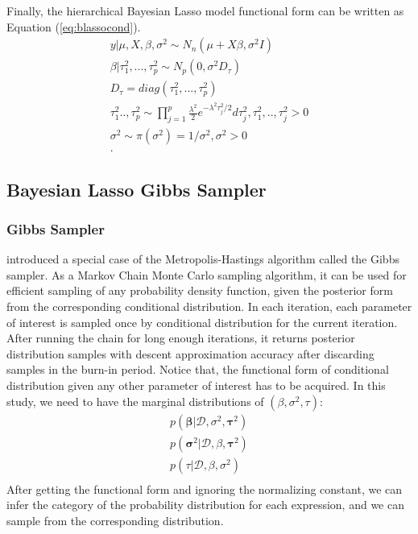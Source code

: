 Finally, the hierarchical Bayesian Lasso model functional form can be written as Equation (\ref{eq:blassocond}).
\begin{equation}
	\label{eq:blassocond}
	\begin{multlined}
		y|\mu,X,\beta,\sigma^2 \sim N_n(\mu + X\beta,\sigma^2I)\\
		\beta|\tau_1^2,...,\tau_p^2 \sim N_p(0,\sigma^2D_{\tau})\\
		D_{\tau} = diag(\tau_1^2,...,\tau_p^2)\\
		\tau_1^2..,\tau_p^2 \sim \prod_{j=1}^p \frac{\lambda^2}{2} e^{-\lambda^2\tau_j^2/2}d\tau_j^2, \tau_1^2,..,\tau_j^2 > 0\\
		\sigma^2 \sim \pi(\sigma^2) = 1/\sigma^2, \sigma^2 > 0\\.
	\end{multlined}
\end{equation}

\subsection{Bayesian Lasso Gibbs Sampler}
\subsubsection{Gibbs Sampler}
\cite{4767596} introduced a special case of the Metropolis-Hastings algorithm called the Gibbs sampler. As a Markov Chain Monte Carlo sampling algorithm, it can be used for efficient sampling of any probability density function, given the posterior form from the corresponding conditional distribution. In each iteration, each parameter of interest is sampled once by conditional distribution for the current iteration. After running the chain for long enough iterations, it returns posterior distribution samples with descent approximation accuracy after discarding samples in the burn-in period. Notice that, the functional form of conditional distribution given any other parameter of interest has to be acquired. In this study, we need to have the marginal distributions of  $(\beta,\sigma^2,\tau)$:
$$
\begin{multlined}
	p(\mathbf{\beta}|\mathcal{D},\sigma^2,\mathbf{\tau}^2)\\
	p(\mathbf{\sigma}^2|\mathcal{D},\beta,\mathbf{\tau}^2)\\
	p(\tau|\mathcal{D},\beta,\sigma^2)\\
\end{multlined}
$$
After getting the functional form and ignoring the normalizing constant, we can infer the category of the probability distribution for each expression, and we can sample from the corresponding distribution.

